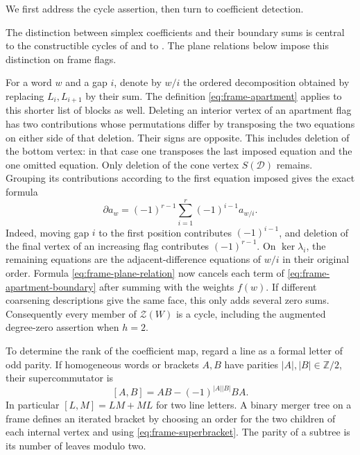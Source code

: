 We first address the cycle assertion, then turn to coefficient detection.

The distinction between simplex coefficients and their boundary sums
is central to the constructible cycles of
\citet[Proposition~4.2 and Definition~4.3, arXiv version~1]{DiazRamos2018} and to
\citet[Proposition~3.2 and Theorems~3.3--3.5]{DiazRamosMazza2022}.
The plane relations below impose this distinction on frame flags.

For a word $w$ and a gap $i$, denote by $w/i$ the ordered decomposition
obtained by replacing $L_i,L_{i+1}$ by their sum.  The definition
\eqref{eq:frame-apartment} applies to this shorter list of blocks as well.
Deleting an interior vertex of an apartment flag has two contributions
whose permutations differ by transposing the two equations on either
side of that deletion.  Their signs are opposite.  This includes deletion
of the bottom vertex: in that case one transposes the last imposed
equation and the one omitted equation.  Only deletion of the cone vertex
$S(\mathcal D)$ remains.  Grouping its contributions according to the
first equation imposed gives the exact formula
\begin{equation}\label{eq:frame-apartment-boundary}
 \partial a_w=(-1)^{r-1}\sum_{i=1}^{r}(-1)^{i-1}a_{w/i}.
\end{equation}
Indeed, moving gap $i$ to the first position contributes $(-1)^{i-1}$,
and deletion of the final vertex of an increasing flag contributes
$(-1)^{r-1}$.  On $\ker\lambda_i$, the remaining equations are the
adjacent-difference equations of $w/i$ in their original order.  Formula
\eqref{eq:frame-plane-relation} now cancels each term of
\eqref{eq:frame-apartment-boundary} after summing with the weights $f(w)$.
If different coarsening descriptions give the same face, this only adds
several zero sums.  Consequently every member of $\mathcal Z(W)$ is a
cycle, including the augmented degree-zero assertion when $h=2$.

To determine the rank of the coefficient map, regard a line as a formal
letter of odd parity.  If homogeneous words or brackets $A,B$ have
parities $|A|,|B|\in\mathbb Z/2$, their supercommutator is
\begin{equation}\label{eq:frame-superbracket}
 [A,B]=AB-(-1)^{|A||B|}BA.
\end{equation}
In particular $[L,M]=LM+ML$ for two line letters.  A binary merger tree
on a frame defines an iterated bracket by choosing an order for the two
children of each internal vertex and using \eqref{eq:frame-superbracket}.
The parity of a subtree is its number of leaves modulo two.

